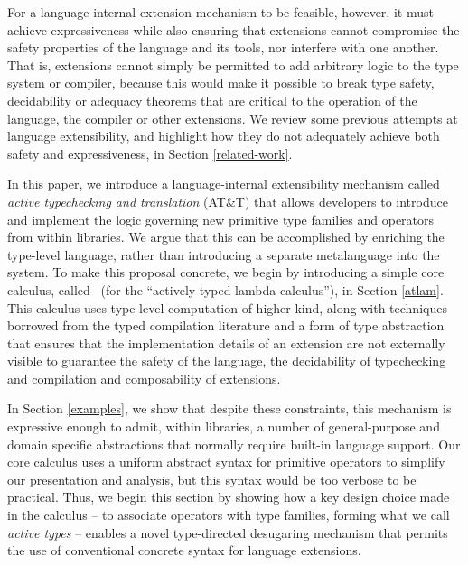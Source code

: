 \documentclass{llncs}
\begin{document}
For a language-internal extension mechanism to be feasible, however, it must achieve expressiveness while also ensuring that extensions cannot compromise the safety properties of the language and its tools, nor interfere with one another. That is, extensions cannot simply be permitted to add arbitrary logic to the type system or compiler, because this would make it possible to break  type safety, decidability or adequacy theorems that are critical to the operation of the language, the compiler or other extensions. We review some previous attempts at language extensibility, and highlight how they do not adequately achieve both safety and expressiveness, in Section \ref{related-work}.

In this paper, we introduce a language-internal extensibility mechanism called \emph{active typechecking and translation} (AT\&T) that allows developers to introduce and implement the logic governing new primitive type families and operators from within libraries. 
We argue that this can be accomplished by enriching the type-level language, rather than introducing a separate metalanguage into the system. 
To make this proposal concrete, we begin by introducing a simple core calculus, called \atlam~(for the ``actively-typed lambda calculus''), in Section \ref{atlam}. 
This calculus uses type-level computation of higher kind, along with techniques borrowed from the typed compilation literature and a form of type abstraction that ensures that the implementation details of an extension are not externally visible to guarantee the safety of the language, the decidability of typechecking and compilation and composability of extensions.

In Section \ref{examples}, we show that despite these constraints, this mechanism is expressive enough to admit, within libraries, a number of general-purpose and domain specific abstractions that normally require built-in language support. Our core calculus uses a uniform abstract syntax for primitive operators to simplify our presentation and analysis, but this syntax would be too verbose to be practical. Thus, we begin this section by showing how a key design choice made in the calculus -- to associate operators with type families, forming what we call \emph{active types} -- enables a novel type-directed desugaring mechanism that permits the use of conventional concrete syntax for language extensions. 
\end{document}
